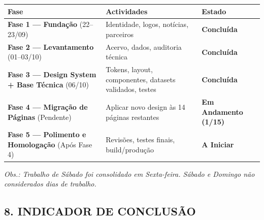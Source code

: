 {\def\LTcaptype{none} %
\begin{longtable}[]{@{}
  >{\raggedright\arraybackslash}p{}
  >{\raggedright\arraybackslash}p{}
  >{\raggedright\arraybackslash}p{}@{}}
\toprule\noalign{}
\begin{minipage}[b]{\linewidth}\raggedright
Fase
\end{minipage} & \begin{minipage}[b]{\linewidth}\raggedright
Actividades
\end{minipage} & \begin{minipage}[b]{\linewidth}\raggedright
Estado
\end{minipage} \\
\midrule\noalign{}
\endhead
\bottomrule\noalign{}
\endlastfoot
\textbf{Fase 1 --- Fundação} (22--23/09) & Identidade, logos, notícias,
parceiros & \textbf{Concluída} \\
\textbf{Fase 2 --- Levantamento} (01--03/10) & Acervo, dados, auditoria
técnica & \textbf{Concluída} \\
\textbf{Fase 3 --- Design System + Base Técnica} (06/10) & Tokens,
layout, componentes, datasets validados, testes & \textbf{Concluída} \\
\textbf{Fase 4 --- Migração de Páginas} (Pendente) & Aplicar novo design
às 14 páginas restantes & \textbf{Em Andamento (1/15)} \\
\textbf{Fase 5 --- Polimento e Homologação} (Após Fase 4) & Revisões,
testes finais, build/produção & \textbf{A Iniciar} \\
\end{longtable}
}

\emph{Obs.: Trabalho de Sábado foi consolidado em Sexta-feira. Sábado e
Domingo não considerados dias de trabalho.}

\subsection{8. INDICADOR DE CONCLUSÃO}\label{indicador-de-conclusuxe3o}

